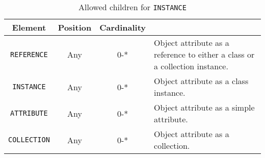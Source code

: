 \begin{table}[!htbp]
\small
\centering
\begin{tabulary}{\linewidth}{|c |c |c|J|}
    \hline 
        \textbf{Element} &
        \textbf{Position} &
        \textbf{Cardinality} &
        \\
    \hline      \hline  
        \texttt{REFERENCE}  &        
        Any &           
        0-* &
         Object attribute as a reference to either a class or a collection instance.\\
    \hline    
        \texttt{INSTANCE} &           
        Any &           
        0-* &
         Object attribute as a class instance. \\
    \hline    
        \texttt{ATTRIBUTE} &           
        Any &           
        0-* &
       Object attribute as a simple attribute. \\
    \hline    
        \texttt{COLLECTION} &           
        Any &           
        0-* &
         Object attribute  as a collection.\\
    \hline 
\end{tabulary}
     \caption{Allowed children for \texttt{INSTANCE}} 
     \label{tbl:instance-chilren}
 \end{table}